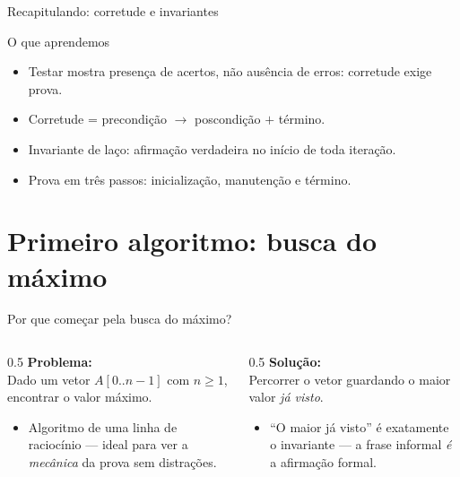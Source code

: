 \documentclass[aspectratio=169]{beamer}
\begin{document}
\begin{frame}{Recapitulando: corretude e invariantes}
  \begin{block}{O que aprendemos}
    \begin{itemize}
      \item Testar mostra presença de acertos, não ausência de erros: corretude exige prova.
      \item Corretude = precondição $\rightarrow$ poscondição $+$ término.
      \item Invariante de laço: afirmação verdadeira no início de toda iteração.
      \item Prova em três passos: inicialização, manutenção e término.
    \end{itemize}
  \end{block}
\end{frame}

\section{Primeiro algoritmo: busca do máximo}

\begin{frame}{Por que começar pela busca do máximo?}
  \begin{columns}[T]
    \begin{column}{0.5\textwidth}
      \textbf{Problema:}\\[2pt]
      Dado um vetor $A[0..n-1]$ com $n \geq 1$, encontrar o valor máximo.
      \begin{itemize}
        \item Algoritmo de uma linha de raciocínio --- ideal para ver a \emph{mecânica} da prova sem distrações.
      \end{itemize}
    \end{column}
    \begin{column}{0.5\textwidth}
      \textbf{Solução:}\\[2pt]
      Percorrer o vetor guardando o maior valor \emph{já visto}.
      \begin{itemize}
        \item ``O maior já visto'' é exatamente o invariante --- a frase informal \emph{é} a afirmação formal.
      \end{itemize}
    \end{column}
  \end{columns}
\end{frame}
\end{document}
